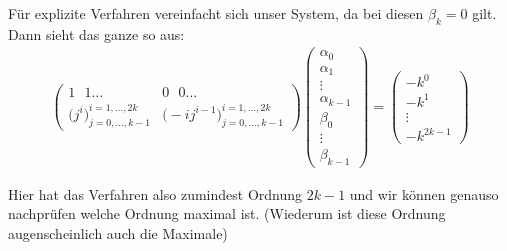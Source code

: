 \begin{solution}
Für explizite Verfahren vereinfacht sich unser System, da bei diesen $\beta_k = 0$ gilt.
Dann sieht das ganze so aus:
\begin{align*}
  \left(\begin{array}{c|c}
    1 \text{ }1\dots & 0\text{ } 0 \dots \\
    \hline
    \bigg( j^i\bigg)_{j=0,\dots,k-1}^{i=1,\dots,2k} & \bigg( -ij^{i-1}\bigg)_{j=0,\dots,k-1}^{i=1,\dots,2k}
  \end{array}\right)
  \left(\begin{array}{c}
    \alpha_0 \\
    \alpha_1 \\
    \vdots \\
    \alpha_{k-1} \\
    \beta_0 \\
    \vdots \\
    \beta_{k-1}
  \end{array}\right) =
  \left(\begin{array}{c}
    -k^0 \\
    -k^1 \\
    \vdots \\
    -k^{2k-1}
  \end{array}\right)
\end{align*}

Hier hat das Verfahren also zumindest Ordnung $2k-1$ und wir können genauso nachprüfen
welche Ordnung maximal ist. (Wiederum ist diese Ordnung augenscheinlich auch die Maximale)
\end{solution}
